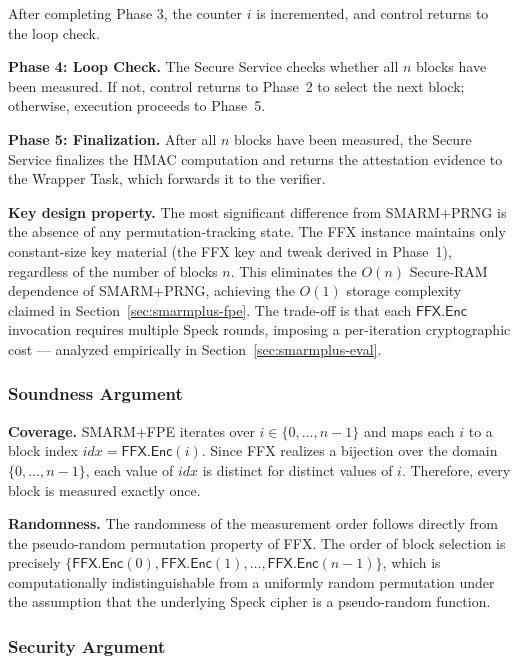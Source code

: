 \documentclass[a4paper,10pt]{article}
\begin{document}
{After completing Phase 3, the counter $i$ is incremented, and 
control returns to the loop check.

\textbf{Phase 4: Loop Check.}
The Secure Service checks whether all $n$ blocks have been 
measured. If not, control returns to Phase~2 to select the next 
block; otherwise, execution proceeds to Phase~5.

\textbf{Phase 5: Finalization.}
After all $n$ blocks have been measured, the Secure Service 
finalizes the HMAC computation and returns the attestation 
evidence to the Wrapper Task, which forwards it to the verifier.

\textbf{Key design property.}
The most significant difference from SMARM+PRNG 
is the absence of any permutation-tracking state. The FFX 
instance maintains only constant-size key material (the FFX key 
and tweak derived in Phase~1), regardless of the number of 
blocks $n$. This eliminates the $O(n)$ Secure-RAM dependence of 
SMARM+PRNG, achieving the $O(1)$ storage 
complexity claimed in 
Section~\ref{sec:smarmplus-fpe}. The trade-off is that each 
$\mathsf{FFX.Enc}$ invocation requires multiple Speck rounds, 
imposing a per-iteration cryptographic cost — analyzed 
empirically in Section~\ref{sec:smarmplus-eval}.

\subsubsection{Soundness Argument}

\textbf{Coverage.} SMARM+FPE iterates over 
$i \in \{0, \ldots, n-1\}$ and maps each $i$ to a block index 
$\mathit{idx} = \textsf{FFX.Enc}(i)$. Since FFX realizes a 
bijection over the domain $\{0, \ldots, n-1\}$, each value of 
$\mathit{idx}$ is distinct for distinct values of $i$. Therefore, 
every block is measured exactly once.

\textbf{Randomness.} The randomness of the measurement order 
follows directly from the pseudo-random permutation property of 
FFX. The order of block selection is precisely 
$\{\textsf{FFX.Enc}(0), \textsf{FFX.Enc}(1), \ldots, 
\textsf{FFX.Enc}(n-1)\}$, which is computationally 
indistinguishable from a uniformly random permutation under the 
assumption that the underlying Speck cipher is a pseudo-random 
function.

\subsubsection{Security Argument}

}
\end{document}
